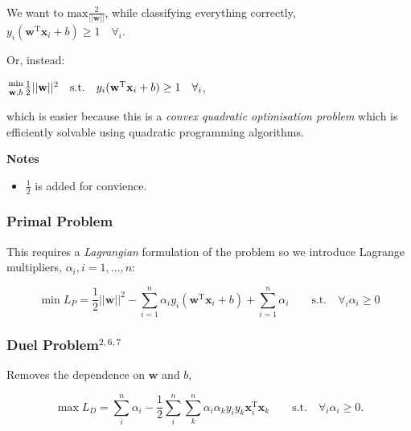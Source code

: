 \documentclass[11pt]{article}
\providecommand{\tightlist}{%
      \setlength{\itemsep}{0pt}\setlength{\parskip}{0pt}}
\begin{document}
    \begin{center}
    \end{center}
    { \hspace*{\fill} \\}
    
    We want to \(\text{max}\frac{2}{||\mathbf{w}||}\), while classifying
everything correctly,
\(y_i(\mathbf{w}^{\mathrm T}\mathbf{x}_i+b) \geq 1 \quad \forall_i\).

Or, instead:

\({\text{min} \atop \mathbf{w}, b}\frac{1}{2}||\mathbf{w}||^2 \quad \text{s.t.} \quad y_i(\mathbf{w}^{\mathrm T}\mathbf{x}_i+b) \geq 1 \quad \forall_i\),

which is easier because this is a \emph{convex quadratic optimisation
problem} which is efficiently solvable using quadratic programming
algorithms.

    \textbf{Notes}

\begin{itemize}
\tightlist
\item
  \(\frac{1}{2}\) is added for convience.
\end{itemize}

    \hypertarget{primal-problem}{%
\subsubsection{Primal Problem}\label{primal-problem}}

This requires a \emph{Lagrangian} formulation of the problem so we
introduce Lagrange multipliers, \(\alpha_i, i = 1, \ldots , n\):

\[
\min L_P = \frac{1}{2}||\mathbf{w}||^2 - \sum^n_{i=1} \alpha_iy_i(\mathbf{w}^{\mathrm T}\mathbf{x}_i+b) + \sum^n_{i=1} \alpha_i \qquad \text{s.t.} \quad \forall_i \alpha_i \geq 0
\]

    \hypertarget{duel-problem267}{%
\subsubsection{\texorpdfstring{Duel
Problem\(^{2,6,7}\)}{Duel Problem\^{}\{2,6,7\}}}\label{duel-problem267}}

Removes the dependence on \(\mathbf{w}\) and \(b\),

\[
\max L_D = \sum_i^n\alpha_i - \frac{1}{2}\sum_i^n\sum_k^n\alpha_i\alpha_ky_iy_k\mathbf{x}_i^{\mathrm T} \mathbf{x}_k \qquad \text{s.t.} \quad \forall_i \alpha_i \geq 0.
\]
\end{document}
